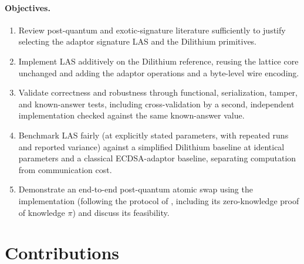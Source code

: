 \paragraph{Objectives.}
\begin{enumerate}
  \item Review post-quantum and exotic-signature literature sufficiently to justify
        selecting the adaptor signature LAS and the Dilithium primitives.
  \item Implement LAS additively on the Dilithium reference, reusing the lattice core
        unchanged and adding the adaptor operations and a byte-level wire encoding.
  \item Validate correctness and robustness through functional, serialization,
        tamper, and known-answer tests, including cross-validation by a second,
        independent implementation checked against the same known-answer value.
  \item Benchmark LAS fairly (at explicitly stated parameters, with repeated runs and
        reported variance) against a simplified Dilithium baseline at identical
        parameters and a classical ECDSA-adaptor baseline, separating computation from
        communication cost.
  \item Demonstrate an end-to-end post-quantum atomic swap using the implementation
        (following the protocol of \cite{esgin2020post}, including its
        zero-knowledge proof of knowledge $\pi$) and discuss its feasibility.
\end{enumerate}

\section{Contributions}
\label{sec:contributions}

